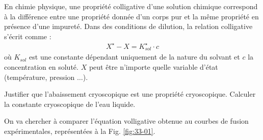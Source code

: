 En chimie physique, une propriété colligative d'une solution chimique correspond à la différence entre une propriété donnée d'un corps pur et la même propriété en présence d'une impureté. Dans des conditions de dilution, la relation colligative s'écrit comme : 
\begin{align}
X^\star - X = K^\star_{sol} \cdot c
\label{eq:Xcp-X}
\end{align}
où $K_{sol}$ est une constante dépendant uniquement de la nature du solvant et $c$ la concentration en soluté. $X$ peut être n'importe quelle variable d'état (température, pression $\ldots$).

\Q\label{Q:05} Justifier que l'abaissement cryoscopique est une propriété cryoscopique. Calculer la constante cryoscopique de l'eau liquide.

On va chercher à comparer l'équation volligative obtenue au courbes de fusion expérimentales, représentées à la Fig. \ref{fig:33-01}.

